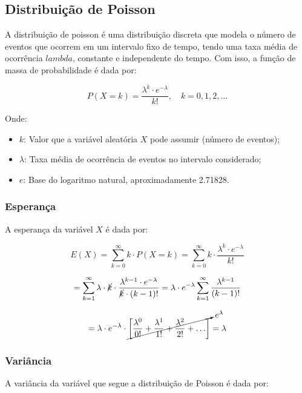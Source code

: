 \documentclass[
]{article}
\begin{document}
\hypertarget{distribuiuxe7uxe3o-de-poisson}{%
\subsection{Distribuição de Poisson}\label{distribuiuxe7uxe3o-de-poisson}}

A distribuição de poisson é uma distribuição discreta que modela o número de eventos que ocorrem em um intervalo fixo de tempo, tendo uma taxa média de ocorrência \(lambda\), constante e independente do tempo. Com isso, a função de massa de probabilidade é dada por:

\[
P(X = k) = \frac{\lambda^k \cdot e^{-\lambda}}{k!}, \quad k = 0, 1, 2, \ldots
\]

Onde:

\begin{itemize}
  \item $k$: Valor que a variável aleatória $X$ pode assumir (número de eventos);
  \item $\lambda$: Taxa média de ocorrência de eventos no intervalo considerado;
  \item $e$: Base do logaritmo natural, aproximadamente 2.71828.
\end{itemize}

\hypertarget{esperanuxe7a-3}{%
\subsubsection{Esperança}\label{esperanuxe7a-3}}

A esperança da variável \(X\) é dada por:

\[
E(X) = \sum_{k=0}^{\infty} k \cdot P(X = k) = \sum_{k=0}^{\infty} k \cdot \frac{\lambda^k \cdot e^{-\lambda}}{k!}
\]

\[
= \sum_{k=1}^{\infty} \lambda \cdot \cancel{k} \cdot \frac{\lambda^{k-1} \cdot e^{-\lambda}}{\cancel{k} \cdot (k-1)!} = \lambda \cdot e^{-\lambda} \sum_{k=1}^{\infty} \frac{\lambda^{k-1}}{(k-1)!}
\]

\[
= \lambda \cdot e^{-\lambda} \cdot \cancelto{e^\lambda}{\left[\frac{\lambda^0}{0!} + \frac{\lambda^1}{1!} + \frac{\lambda^2}{2!} + \ldots \right]} = \lambda
\]

\hypertarget{variuxe2ncia-3}{%
\subsubsection{Variância}\label{variuxe2ncia-3}}

A variância da variável que segue a distribuição de Poisson é dada por:
\end{document}
